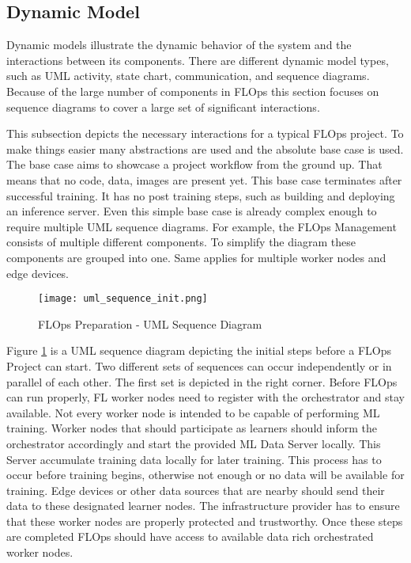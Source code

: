 \subsection{Dynamic Model}
Dynamic models illustrate the dynamic behavior of the system and the interactions between its components.
There are different dynamic model types, such as UML activity, state chart, communication, and sequence diagrams.
Because of the large number of components in FLOps this section focuses on sequence diagrams to cover a large set of significant interactions.

This subsection depicts the necessary interactions for a typical FLOps project.
To make things easier many abstractions are used and the absolute base case is used.
The base case aims to showcase a project workflow from the ground up.
That means that no code, data, images are present yet.
This base case terminates after successful training.
It has no post training steps, such as building and deploying an inference server.
Even this simple base case is already complex enough to require multiple UML sequence diagrams.
For example, the FLOps Management consists of multiple different components.
To simplify the diagram these components are grouped into one.
Same applies for multiple worker nodes and edge devices.

\begin{figure}[h]
    \begin{adjustwidth}{-0.1\paperwidth}{-0.1\paperwidth}
        \centering
        \texttt{[image: uml\_sequence\_init.png]}
        \caption{FLOps Preparation - UML Sequence Diagram}
        \label{fig:uml_sequence_init}
    \end{adjustwidth}
\end{figure}

Figure \ref{fig:uml_sequence_init} is a UML sequence diagram depicting the initial steps before a FLOps Project can start.
Two different sets of sequences can occur independently or in parallel of each other.
The first set is depicted in the right corner.
Before FLOps can run properly, FL worker nodes need to register with the orchestrator and stay available.
Not every worker node is intended to be capable of performing ML training.
Worker nodes that should participate as learners should inform the orchestrator accordingly and start the provided ML Data Server locally.
This Server accumulate training data locally for later training.
This process has to occur before training begins, otherwise not enough or no data will be available for training.
Edge devices or other data sources that are nearby should send their data to these designated learner nodes.
The infrastructure provider has to ensure that these worker nodes are properly protected and trustworthy.
Once these steps are completed FLOps should have access to available data rich orchestrated worker nodes.

